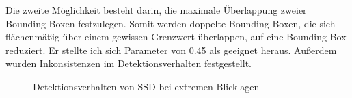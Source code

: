 Die zweite Möglichkeit besteht darin, die maximale Überlappung zweier Bounding Boxen festzulegen. Somit werden doppelte Bounding Boxen, die sich flächenmäßig über einem gewissen Grenzwert überlappen, auf eine Bounding Box reduziert. Er stellte ich sich Parameter von 0.45 als geeignet heraus. Außerdem wurden Inkonsistenzen im Detektionsverhalten festgestellt.

\begin{figure}[H]
	\hfill
	\hfill
	\hfill
	\caption{Detektionsverhalten von SSD bei extremen Blicklagen}
	\label{lagen}
\end{figure}

